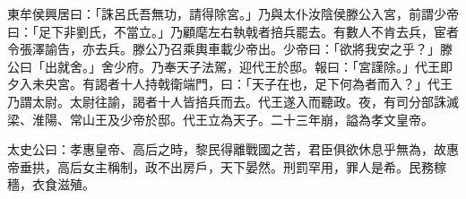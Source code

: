 \begin{pinyinscope}
東牟侯興居曰：「誅呂氏吾無功，請得除宮。」乃與太仆汝陰侯滕公入宮，前謂少帝曰：「足下非劉氏，不當立。」乃顧麾左右執戟者掊兵罷去。有數人不肯去兵，宦者令張澤諭告，亦去兵。滕公乃召乘輿車載少帝出。少帝曰：「欲將我安之乎？」滕公曰「出就舍。」舍少府。乃奉天子法駕，迎代王於邸。報曰：「宮謹除。」代王即夕入未央宮。有謁者十人持戟衛端門，曰：「天子在也，足下何為者而入？」代王乃謂太尉。太尉往諭，謁者十人皆掊兵而去。代王遂入而聽政。夜，有司分部誅滅梁、淮陽、常山王及少帝於邸。代王立為天子。二十三年崩，謚為孝文皇帝。

太史公曰：孝惠皇帝、高后之時，黎民得離戰國之苦，君臣俱欲休息乎無為，故惠帝垂拱，高后女主稱制，政不出房戶，天下晏然。刑罰罕用，罪人是希。民務稼穡，衣食滋殖。


\end{pinyinscope}